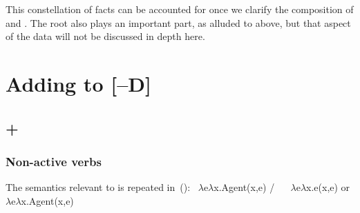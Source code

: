 This constellation of facts can be accounted for once we clarify the composition of {\va} and {\vz}. The root also plays an important part, as alluded to above, but that aspect of the data will not be discussed in depth here.




\section{Adding {\va} to [--D]} \label{vz:va}

	\subsection{{\va} + {\vz}} \label{vz:va:vzva}
		\subsubsection{Non-active verbs}

The semantics relevant to {\va} is repeated in~(\nextx):
\pex\label{ex:vz:denote-va}
	\a {} \lra~$\lambda$e$\lambda$x.Agent(x,e) / \trace~\va
	\a {} \lra~$\lambda$e$\lambda$x.e(x,e) or $\lambda$e$\lambda$x.Agent(x,e)
\xe

